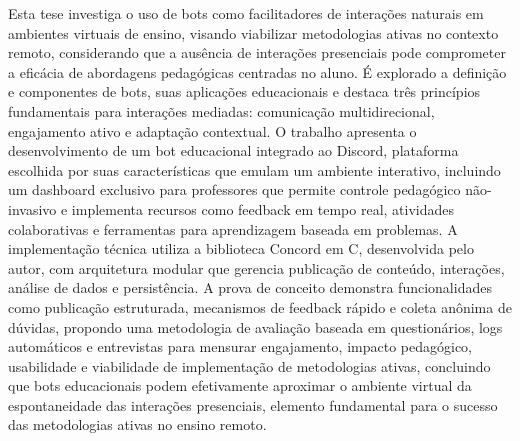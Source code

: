 \begin{resumo}

Esta tese investiga o uso de bots como facilitadores de interações naturais em ambientes virtuais de ensino, visando viabilizar metodologias ativas no contexto remoto, considerando que a ausência de interações presenciais pode comprometer a eficácia de abordagens pedagógicas centradas no aluno. É explorado a definição e componentes de bots, suas aplicações educacionais e destaca três princípios fundamentais para interações mediadas: comunicação multidirecional, engajamento ativo e adaptação contextual. O trabalho apresenta o desenvolvimento de um bot educacional integrado ao Discord, plataforma escolhida por suas características que emulam um ambiente interativo, incluindo um dashboard exclusivo para professores que permite controle pedagógico não-invasivo e implementa recursos como feedback em tempo real, atividades colaborativas e ferramentas para aprendizagem baseada em problemas. A implementação técnica utiliza a biblioteca Concord em C, desenvolvida pelo autor, com arquitetura modular que gerencia publicação de conteúdo, interações, análise de dados e persistência. A prova de conceito demonstra funcionalidades como publicação estruturada, mecanismos de feedback rápido e coleta anônima de dúvidas, propondo uma metodologia de avaliação baseada em questionários, logs automáticos e entrevistas para mensurar engajamento, impacto pedagógico, usabilidade e viabilidade de implementação de metodologias ativas, concluindo que bots educacionais podem efetivamente aproximar o ambiente virtual da espontaneidade das interações presenciais, elemento fundamental para o sucesso das metodologias ativas no ensino remoto.

\end{resumo}
